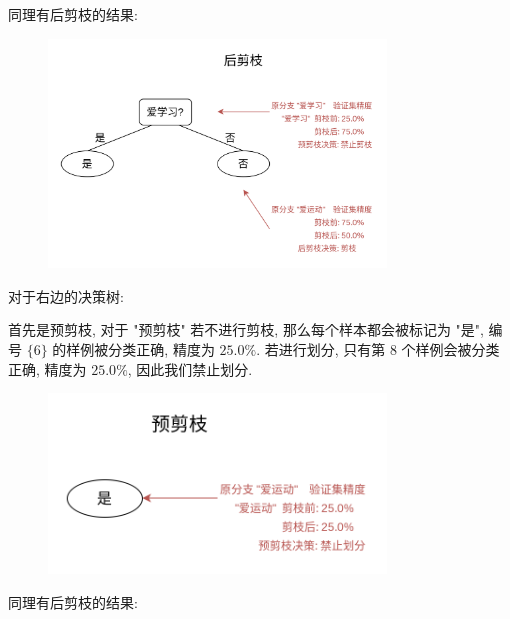 \documentclass[answers]{exam}  %
\begin{document}
\begin{questions}
\begin{solution}
\begin{enumerate}
            同理有后剪枝的结果:

            \begin{figure}[H]
              \centering
              \includegraphics[width=0.8\textwidth]{./figure/PS3-3-2-2.png}
              \label{Fig.main1}
            \end{figure}

            对于右边的决策树:

            首先是预剪枝, 对于 "预剪枝" 若不进行剪枝, 那么每个样本都会被标记为 "是", 编号 $\{ 6 \}$ 的样例被分类正确, 精度为 $25.0\%$. 若进行划分, 只有第 $8$ 个样例会被分类正确, 精度为 $25.0\%$, 因此我们禁止划分.

            \begin{figure}[H]
              \centering
              \includegraphics[width=0.8\textwidth]{./figure/PS3-3-2-3.png}
              \label{Fig.main1}
            \end{figure}

            同理有后剪枝的结果:


\end{enumerate}
\end{solution}
\end{questions}
\end{document}
